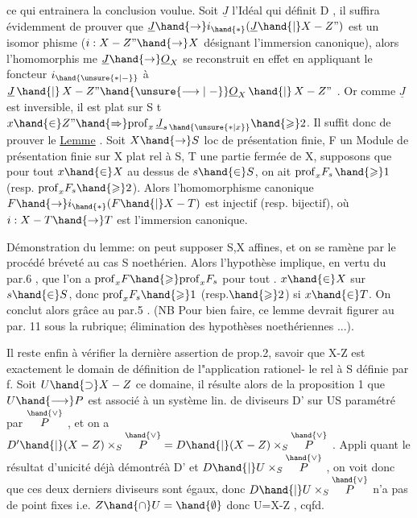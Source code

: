 
\placedmargin{$|$}\placedmargin{$\wr$}ce qui entrainera la conclusion voulue. Soit $\underline{J}$ l'Idéal qui définit
D , il suffira évidemment de prouver que $\underline{J}\hand{\to} i_{\hand{*}}(\underline{J}\hand{|}X-Z")$ est un isomor
phisme ($i:X-Z"\hand{\to} X$ désignant l'immersion canonique), alors l'homomorphis
me $\underline{J}\hand{\to}\underline{O}_X$ se reconstruit en effet en appliquant le foncteur $i_{\hand{\unsure{*|\relbar}}}$ à
$\underline{J}\,\hand{|}\,X-Z" \hand{\unsure{\longrightarrow|\relbar}} \underline{O}_X\,\hand{|}\,X-Z"$ . Or comme $\underline{J}$ est inversible, il est plat sur S t
 $x\hand{\in} Z" \hand{\Rightarrow} \mathrm{prof}_x\,\underline{J}_{s\,\hand{\unsure{*|x}}} \hand{\geqslant} 2$. Il suffit donc de prouver le
\uline{Lemme} . Soit $X\hand{\to} S$ loc de présentation finie, F un Module de présentation
finie sur X plat rel à S, T une partie fermée de X, supposons que pour
tout $x\hand{\in} X$ au dessus de $s\hand{\in} S$, on ait \hand{\unsure{/}} $\mathrm{prof}_x F_{s\,}\hand{\geqslant} 1$ (resp. $\mathrm{prof}_x F_s \hand{\geqslant} 2$).
Alors l'homomorphisme canonique $F\hand{\to} i_{\hand{*}}(F\hand{|}X-T)$ est injectif (resp.
bijectif), où $i:X-T\hand{\to} T$ est l'immersion canonique.

Démonstration du lemme: on peut supposer S,X affines, et on se
ramène par le procédé bréveté au cas S noethérien. Alors l'hypothèse
implique, en vertu du par.6 , que l'on a $\mathrm{prof}_x F \hand{\geqslant} \mathrm{prof}_x F_s$ pour tout .
$x\hand{\in} X$ sur $s\hand{\in} S$, donc $\mathrm{prof}_x F_s \hand{\geqslant} 1$ (resp.$\hand{\geqslant} 2$) si $x\hand{\in} T$. On conclut alors
grâce au par.5 . (NB Pour bien faire, ce lemme devrait figurer au par.
11 sous la rubrique; élimination des hypothèses noethériennes ...).

Il reste enfin à vérifier la dernière assertion de prop.2, savoir
que X-Z est exactement le domain de définition de l"application rationel-%
le rel à S définie par f. Soit $U\hand{\supset} X-Z$ ce domaine, il résulte alors de
la proposition 1 que $U\hand{\longrightarrow} P$ est associé à un système lin. de diviseurs
D' sur US paramétré par $\overset{\hand{\vee}}{P}$ , et on a $D'\hand{|}(X-Z)\times_S\overset{\hand{\vee}}{P} = D\hand{|}(X-Z)\times_S\overset{\hand{\vee}}{P}$ . Appli
quant le résultat d'unicité \hand{(}déjà démontré\hand{)}à D' et $D\hand{|}U\times_S\overset{\hand{\vee}}{P}$ , on voit donc
que ces deux derniers diviseurs sont égaux, donc $D\hand{|}U\times_S\overset{\hand{\vee}}{P}$ n'a pas de
point fixes i.e. $Z\hand{\cap} U=\hand{\emptyset}$ donc U=X-Z , cqfd.

